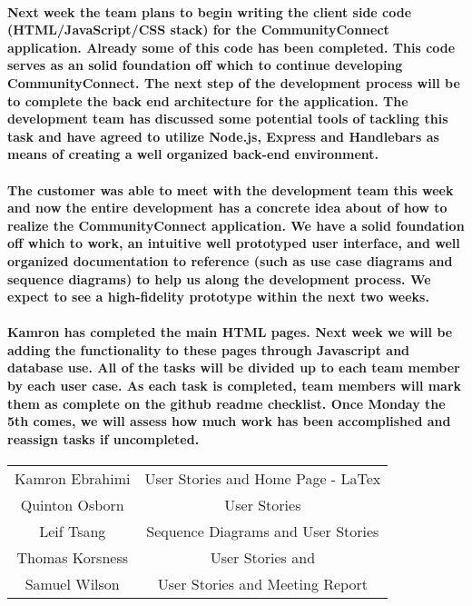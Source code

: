 \documentclass[12pt]{article}
\begin{document}
\paragraph{\normalfont \indent Next week the team plans to begin writing the client side code (HTML/JavaScript/CSS stack) for the CommunityConnect application. Already some of this code has been completed. This code serves as an solid foundation off which to continue developing CommunityConnect. The next step of the development process will be to complete the back end architecture for the application. The development team has discussed some potential tools of tackling this task and have agreed to utilize Node.js, Express and Handlebars as means of creating a well organized back-end environment.
}
\paragraph{\normalfont \indent The customer was able to meet with the development team this week and now the entire
development has a concrete idea about of how to realize the CommunityConnect application. We have a solid foundation off which to work, an intuitive well prototyped user interface, and well organized documentation to reference (such as use case diagrams and sequence diagrams) to help us along the development process. We expect to see a high-fidelity prototype within the next two weeks.
}
\paragraph{\normalfont \indent Kamron has completed the main HTML pages. Next week we will be adding the functionality to these pages through Javascript and database use. All of the tasks will be divided up to each team member by each user case. As each task is completed, team members will mark them as complete on the github readme checklist. Once Monday the 5th comes, we will assess how much work has been accomplished and reassign tasks if uncompleted.
}

\begin{center}
\begin{tabular}{ |c|c| }
 \hline
 Kamron Ebrahimi & User Stories and Home Page - LaTex \\
 Quinton Osborn & User Stories \\
 Leif Tsang & Sequence Diagrams and User Stories \\
 Thomas Korsness & User Stories and \\
 Samuel Wilson & User Stories and Meeting Report \\
 \hline
\end{tabular}
\end{center}
\end{document}
